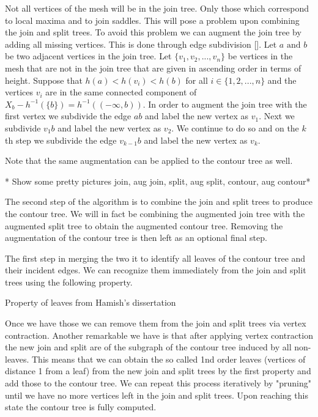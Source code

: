 Not all vertices of the mesh will be in the join tree. Only those which correspond to local maxima and to join saddles. This will pose a problem upon combining the join and split trees. To avoid this problem we can augment the join tree by adding all missing vertices. This is done through edge subdivision []. Let $a \text{ and } b$ be two adjacent vertices in the join tree.  Let $\{v_1, v_2, ..., v_n\}$ be vertices in the mesh that are not in the join tree that are given in ascending order in terms of height.  Suppose that $h(a) < h(v_i) < h(b)$ for all $i \in \{1, 2, ..., n\}$ and the vertices $v_i$ are in the same connected component of $X_b - h^{-1}(\{b\}) = h^{-1}((-\infty, b))$. In order to augment the join tree with the first vertex we subdivide the edge $ab$ and label the new vertex as $v_1$. Next we subdivide $v_1b$ and label the new vertex as $v_2$. We continue to do so and on the $k$th step we subdivide the edge $v_{k-1}b$ and label the new vertex as $v_k$.

Note that the same augmentation can be applied to the contour tree as well.

* Show some pretty pictures join, aug join, split, aug split, contour, aug contour*

The second step of the algorithm is to combine the join and split trees to produce the contour tree. We will in fact be combining the augmented join tree with the augmented split tree to obtain the augmented contour tree. Removing the augmentation of the contour tree is then left as an optional final step.

The first step in merging the two it to identify all leaves of the contour tree and their incident edges. We can recognize them immediately from the join and split trees using the following property.

\begin{defn} Property of leaves from Hamish's dissertation   \end{defn}


Once we have those we can remove them from the join and split trees via vertex contraction. Another remarkable we have is that after applying vertex contraction the new join and split are of the subgraph of the contour tree induced by all non-leaves. This means that we can obtain the so called 1nd order leaves (vertices of distance 1 from a leaf) from the new join and split trees by the first property and add those to the contour tree. We can repeat this process iteratively by "pruning" until we have no more vertices left in the join and split trees. Upon reaching this state the contour tree is fully computed.

